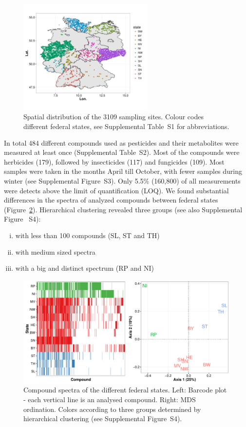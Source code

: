 \documentclass[journal=esthag,manuscript=article]{achemso}
\begin{document}
\begin{figure}[ht]
  \includegraphics[width=0.6\textwidth]{figure1.pdf}
  \caption{Spatial distribution of the 3109 sampling sites. Colour codes different federal states, see Supplemental Table~S1 for abbreviations.}
  \label{fig:fig1}
\end{figure}

In total 484 different compounds used as pesticides and their metabolites were measured at least once (Supplemental Table~S2). 
Most of the compounds were herbicides (179), followed by insecticides (117) and fungicides (109).
Most samples were taken in the months April till October, with fewer samples during winter (see Supplemental Figure~S3).
Only 5.5\% (160,800) of all measurements were detects above the limit of quantification (LOQ).
We found substantial differences in the spectra of analyzed compounds between federal states (Figure~\ref{fig:fig2}).
Hierarchical clustering revealed three groups (see also Supplemental Figure~ S4):

\begin{enumerate}[i)]
	\item with less than 100 compounds (SL, ST and TH)
	\item with medium sized spectra
	\item with a big and distinct spectrum (RP and NI)
\end{enumerate}

\begin{figure}[ht]
  \includegraphics[width=\textwidth]{figure2.pdf}
  \caption{Compound spectra of the different federal states. Left: Barcode plot - each vertical line is an analysed compound. Right: MDS ordination. 
  Colors according to three groups determined by hierarchical clustering (see Supplemental Figure~S4).}
  \label{fig:fig2}
\end{figure}
\end{document}
